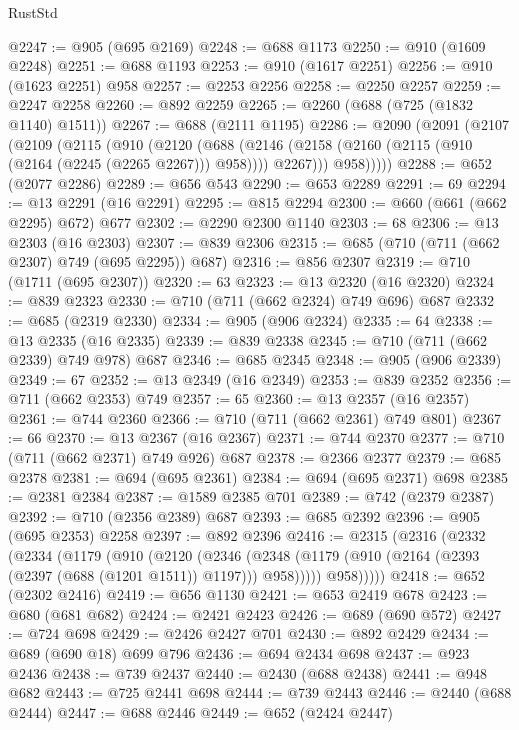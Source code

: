 \begin{lexlean}{RustStd}
\begin{coremodule}
@2247 := @905 (@695 @2169)
@2248 := @688 @1173
@2250 := @910 (@1609 @2248)
@2251 := @688 @1193
@2253 := @910 (@1617 @2251)
@2256 := @910 (@1623 @2251) @958
@2257 := @2253 @2256
@2258 := @2250 @2257
@2259 := @2247 @2258
@2260 := @892 @2259
@2265 := @2260 (@688 (@725 (@1832 @1140) @1511))
@2267 := @688 (@2111 @1195)
@2286 := @2090
    (@2091
      (@2107
        (@2109
          (@2115
            (@910
              (@2120
                (@688
                  (@2146 (@2158 (@2160 (@2115 (@910 (@2164 (@2245 (@2265 @2267))) @958)))) @2267)))
              @958)))))
@2288 := @652 (@2077 @2286)
@2289 := @656 @543
@2290 := @653 @2289
@2291 := 69
@2294 := @13 @2291 (@16 @2291)
@2295 := @815 @2294
@2300 := @660 (@661 (@662 @2295) @672) @677
@2302 := @2290 @2300 @1140
@2303 := 68
@2306 := @13 @2303 (@16 @2303)
@2307 := @839 @2306
@2315 := @685 (@710 (@711 (@662 @2307) @749 (@695 @2295)) @687)
@2316 := @856 @2307
@2319 := @710 (@1711 (@695 @2307))
@2320 := 63
@2323 := @13 @2320 (@16 @2320)
@2324 := @839 @2323
@2330 := @710 (@711 (@662 @2324) @749 @696) @687
@2332 := @685 (@2319 @2330)
@2334 := @905 (@906 @2324)
@2335 := 64
@2338 := @13 @2335 (@16 @2335)
@2339 := @839 @2338
@2345 := @710 (@711 (@662 @2339) @749 @978) @687
@2346 := @685 @2345
@2348 := @905 (@906 @2339)
@2349 := 67
@2352 := @13 @2349 (@16 @2349)
@2353 := @839 @2352
@2356 := @711 (@662 @2353) @749
@2357 := 65
@2360 := @13 @2357 (@16 @2357)
@2361 := @744 @2360
@2366 := @710 (@711 (@662 @2361) @749 @801)
@2367 := 66
@2370 := @13 @2367 (@16 @2367)
@2371 := @744 @2370
@2377 := @710 (@711 (@662 @2371) @749 @926) @687
@2378 := @2366 @2377
@2379 := @685 @2378
@2381 := @694 (@695 @2361)
@2384 := @694 (@695 @2371) @698
@2385 := @2381 @2384
@2387 := @1589 @2385 @701
@2389 := @742 (@2379 @2387)
@2392 := @710 (@2356 @2389) @687
@2393 := @685 @2392
@2396 := @905 (@695 @2353) @2258
@2397 := @892 @2396
@2416 := @2315
    (@2316
      (@2332
        (@2334
          (@1179
            (@910
              (@2120
                (@2346
                  (@2348 (@1179 (@910 (@2164 (@2393 (@2397 (@688 (@1201 @1511)) @1197))) @958)))))
              @958)))))
@2418 := @652 (@2302 @2416)
@2419 := @656 @1130
@2421 := @653 @2419 @678
@2423 := @680 (@681 @682)
@2424 := @2421 @2423
@2426 := @689 (@690 @572)
@2427 := @724 @698
@2429 := @2426 @2427 @701
@2430 := @892 @2429
@2434 := @689 (@690 @18) @699 @796
@2436 := @694 @2434 @698
@2437 := @923 @2436
@2438 := @739 @2437
@2440 := @2430 (@688 @2438)
@2441 := @948 @682
@2443 := @725 @2441 @698
@2444 := @739 @2443
@2446 := @2440 (@688 @2444)
@2447 := @688 @2446
@2449 := @652 (@2424 @2447)

\end{coremodule}
\end{lexlean}
